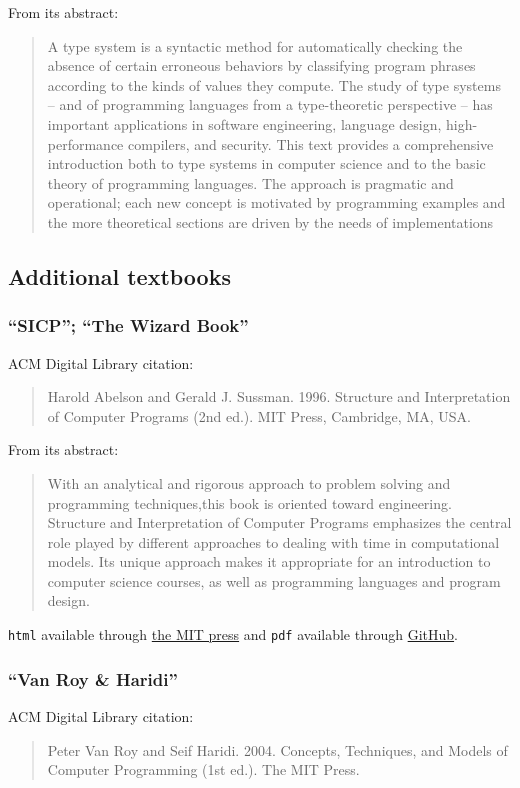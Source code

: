 \documentclass[11pt]{article}
\begin{document}
From its abstract:
\begin{quote}
A type system is a syntactic method for automatically checking the
absence of certain erroneous behaviors by classifying program phrases
according to the kinds of values they compute. The study of type systems
– and of programming languages from a type-theoretic perspective –
has important applications in software engineering, language design,
high-performance compilers, and security. This text provides a
comprehensive introduction both to type systems in computer science
and to the basic theory of programming languages. The approach is
pragmatic and operational; each new concept is motivated by programming
examples and the more theoretical sections are driven by the
needs of implementations
\end{quote}

\subsection{Additional textbooks}
\label{sec:org4791600}
\subsubsection{\textbf{“SICP”}; “The Wizard Book”}
\label{sec:org5026abf}
ACM Digital Library citation:
\begin{quote}
Harold Abelson and Gerald J. Sussman. 1996.
Structure and Interpretation of Computer Programs (2nd ed.).
MIT Press, Cambridge, MA, USA.
\end{quote}

From its abstract:
\begin{quote}
With an analytical and rigorous approach to problem solving
and programming techniques,this book is oriented toward engineering.
Structure and Interpretation of Computer Programs emphasizes
the central role played by different approaches
to dealing with time in computational models.
Its unique approach makes it appropriate for
an introduction to computer science courses,
as well as programming languages and program design.
\end{quote}

\texttt{html} available through
\href{https://mitpress.mit.edu/sites/default/files/sicp/index.html}{the MIT press}
and \texttt{pdf} available through
\href{https://github.com/sarabander/sicp-pdf}{GitHub}.
\subsubsection{\textbf{“Van Roy \& Haridi”}}
\label{sec:orga8bd187}
ACM Digital Library citation:
\begin{quote}
Peter Van Roy and Seif Haridi. 2004.
Concepts, Techniques, and Models of Computer Programming (1st ed.).
The MIT Press.
\end{quote}
\end{document}
